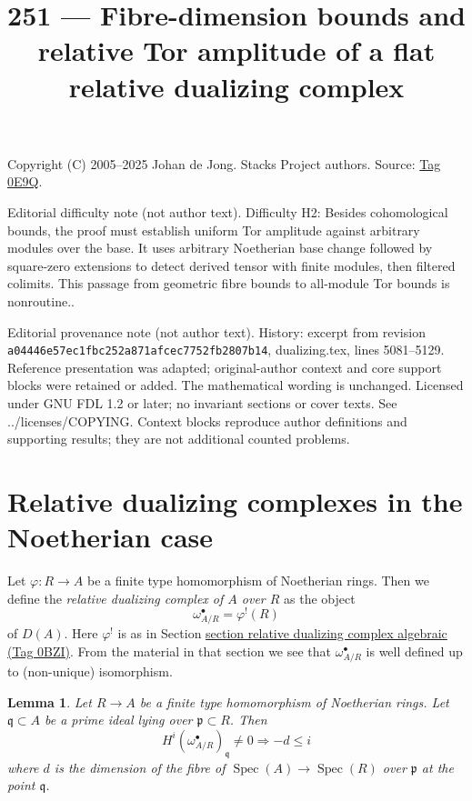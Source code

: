 \documentclass{amsart}
\theoremstyle{plain}
\newtheorem{lemma}[subsection]{Lemma}
\theoremstyle{definition}
\theoremstyle{remark}
\numberwithin{equation}{subsection}
\def\Spec{\mathop{\mathrm{Spec}}}
\begin{document}
\title[Stacks Project, Tag 0E9Q]{251 --- Fibre-dimension bounds and relative Tor amplitude of a flat relative dualizing complex}
\maketitle
\noindent Copyright (C) 2005--2025 Johan de Jong. Stacks Project authors. Source: \href{https://stacks.math.columbia.edu/tag/0E9Q}{Tag 0E9Q}.

\noindent Editorial difficulty note (not author text). Difficulty H2: Besides cohomological bounds, the proof must establish uniform Tor amplitude against arbitrary modules over the base. It uses arbitrary Noetherian base change followed by square-zero extensions to detect derived tensor with finite modules, then filtered colimits. This passage from geometric fibre bounds to all-module Tor bounds is nonroutine..

\noindent Editorial provenance note (not author text). History: excerpt from revision \texttt{a0444\allowbreak 6e57e\allowbreak c1fbc\allowbreak 252a8\allowbreak 71afc\allowbreak ec775\allowbreak 2fb28\allowbreak 07b14}, dualizing.tex, lines 5081--5129. Reference presentation was adapted; original-author context and core support blocks were retained or added. The mathematical wording is unchanged. Licensed under GNU FDL 1.2 or later; no invariant sections or cover texts. See ../licenses/COPYING. Context blocks reproduce author definitions and supporting results; they are not additional counted problems.

\section{Relative dualizing complexes in the Noetherian case}
\label{section-relative-dualizing-complexes-Noetherian}

\noindent
Let $\varphi : R \to A$ be a finite type homomorphism of
Noetherian rings. Then we define the {\it relative dualizing
complex of $A$ over $R$} as the object
$$
\omega_{A/R}^\bullet = \varphi^!(R)
$$
of $D(A)$. Here $\varphi^!$ is as in
Section \href{https://stacks.math.columbia.edu/tag/0BZI}{section relative dualizing complex algebraic (Tag 0BZI)}.
From the material in that section we see that
$\omega_{A/R}^\bullet$ is well defined up to (non-unique) isomorphism.



\begin{lemma}
\label{lemma-relative-dualizing-trivial-vanishing}
Let $R \to A$ be a finite type homomorphism of Noetherian rings.
Let $\mathfrak q \subset A$ be a prime ideal lying over
$\mathfrak p \subset R$. Then
$$
H^i(\omega_{A/R}^\bullet)_\mathfrak q \not = 0
\Rightarrow - d \leq i
$$
where $d$ is the dimension of the fibre of $\Spec(A) \to \Spec(R)$
over $\mathfrak p$ at the point $\mathfrak q$.
\end{lemma}
\end{document}
